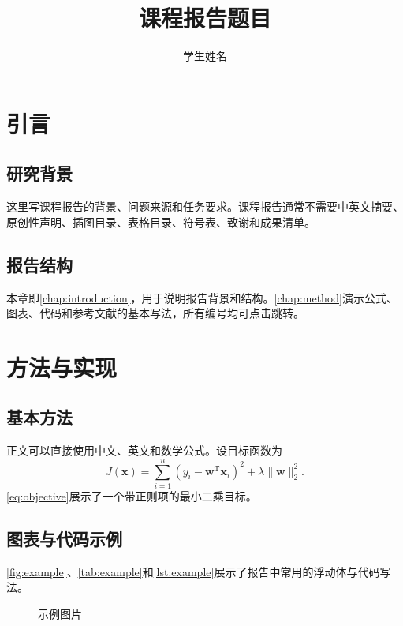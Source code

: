 \documentclass[course]{course-report}
\title{课程报告题目}{Course Report Title}
\author{学生姓名}{Student Name}
\begin{document}
\makecover

\thesistableofcontents

\chapter{引言}
\label{chap:introduction}

\section{研究背景}

这里写课程报告的背景、问题来源和任务要求。课程报告通常不需要中英文摘要、原创性声明、插图目录、表格目录、符号表、致谢和成果清单。

\section{报告结构}

本章即\autoref{chap:introduction}，用于说明报告背景和结构。\autoref{chap:method}演示公式、图表、代码和参考文献的基本写法，所有编号均可点击跳转。

\chapter{方法与实现}
\label{chap:method}

\section{基本方法}

正文可以直接使用中文、英文和数学公式。设目标函数为
\begin{equation}
  \label{eq:objective}
  J(\bm{x})=\sum_{i=1}^{n}(y_i-\bm{w}^{\mathrm{T}}\bm{x}_i)^2+\lambda\lVert\bm{w}\rVert_2^2 .
\end{equation}
\autoref{eq:objective}展示了一个带正则项的最小二乘目标。

\section{图表与代码示例}

\autoref{fig:example}、\autoref{tab:example}和\autoref{lst:example}展示了报告中常用的浮动体与代码写法。

\begin{figure}[htbp]
  \centering
  \caption{示例图片}
  \label{fig:example}
\end{figure}
\end{document}
